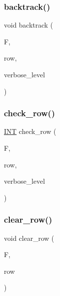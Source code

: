 \subsubsection{\texorpdfstring{backtrack()}{backtrack()}}
{\footnotesize\ttfamily void backtrack (\begin{DoxyParamCaption}\item[{\mbox{\hyperlink{classfinite__field}{finite\+\_\+field}} $\ast$}]{F,  }\item[{\mbox{\hyperlink{galois_8h_a09fddde158a3a20bd2dcadb609de11dc}{I\+NT}}}]{row,  }\item[{\mbox{\hyperlink{galois_8h_a09fddde158a3a20bd2dcadb609de11dc}{I\+NT}}}]{verbose\+\_\+level }\end{DoxyParamCaption})}

\mbox{\label{plane__search_8_c_a7c747c8628656ffafe9b2d862bbd6751}} 
\subsubsection{\texorpdfstring{check\+\_\+row()}{check\_row()}}
{\footnotesize\ttfamily \mbox{\hyperlink{galois_8h_a09fddde158a3a20bd2dcadb609de11dc}{I\+NT}} check\+\_\+row (\begin{DoxyParamCaption}\item[{\mbox{\hyperlink{classfinite__field}{finite\+\_\+field}} $\ast$}]{F,  }\item[{\mbox{\hyperlink{galois_8h_a09fddde158a3a20bd2dcadb609de11dc}{I\+NT}}}]{row,  }\item[{\mbox{\hyperlink{galois_8h_a09fddde158a3a20bd2dcadb609de11dc}{I\+NT}}}]{verbose\+\_\+level }\end{DoxyParamCaption})}

\mbox{\label{plane__search_8_c_a01be99b2c2aaa2497103b10c56fd259e}} 
\subsubsection{\texorpdfstring{clear\+\_\+row()}{clear\_row()}}
{\footnotesize\ttfamily void clear\+\_\+row (\begin{DoxyParamCaption}\item[{\mbox{\hyperlink{classfinite__field}{finite\+\_\+field}} $\ast$}]{F,  }\item[{\mbox{\hyperlink{galois_8h_a09fddde158a3a20bd2dcadb609de11dc}{I\+NT}}}]{row }\end{DoxyParamCaption})}

